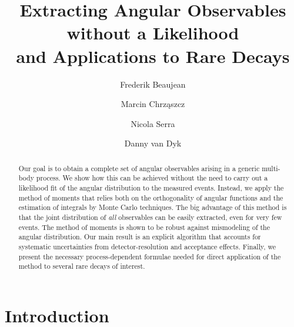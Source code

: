 \documentclass[aps,nofootinbib,preprintnumbers,prd,twocolumn]{revtex4-1}
\begin{document}
\allowdisplaybreaks

\title{Extracting Angular Observables without a Likelihood\\and Applications to Rare Decays}
\author{Frederik Beaujean}
\author{Marcin Chrz\k{a}szcz}
\author{Nicola Serra}
\author{Danny van Dyk}

\begin{abstract}
  Our goal is to obtain a complete set of angular observables arising
  in a generic multi-body process. We show how this can be achieved
  without the need to carry out a likelihood fit of the angular
  distribution to the measured events. Instead, we apply the method of
  moments that relies both on the orthogonality of angular functions
  and the estimation of integrals by Monte Carlo techniques. The big
  advantage of this method is that the joint distribution of \emph{all}
  observables can be easily extracted, even for very few events. The
  method of moments is shown to be robust against mismodeling of the
  angular distribution. Our main result is an explicit algorithm that
  accounts for systematic uncertainties from detector-resolution and
  acceptance effects. Finally, we present the necessary
  process-dependent formulae needed for direct application of the
  method to several rare decays of interest.
\end{abstract}

\maketitle

\section{Introduction}
\label{sec:intro}
\end{document}
